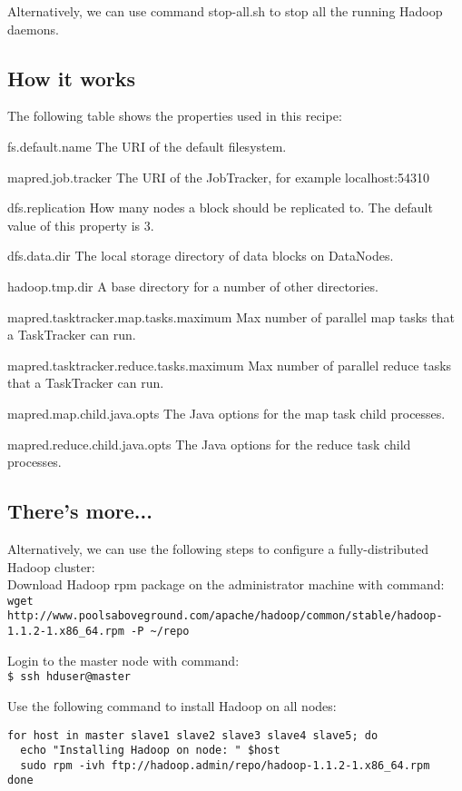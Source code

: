 Alternatively, we can use command stop-all.sh to stop all the running Hadoop daemons.

\subsection*{How it works}
The following table shows the properties used in this recipe:

\begin{description}
    \item{fs.default.name} The URI of the default filesystem.
    \item{mapred.job.tracker} The URI of the JobTracker, for example localhost:54310
    \item{dfs.replication} How many nodes a block should be replicated to. The default value of this property is 3.
    \item{dfs.data.dir} The local storage directory of data blocks on DataNodes.
    \item{hadoop.tmp.dir} A base directory for a number of other directories.
    \item{mapred.tasktracker.map.tasks.maximum} Max number of parallel map tasks that a TaskTracker can run.
    \item{mapred.tasktracker.reduce.tasks.maximum} Max number of parallel reduce tasks that a TaskTracker can run.
    \item{mapred.map.child.java.opts} The Java options for the map task child processes.
    \item{mapred.reduce.child.java.opts} The Java options for the reduce task child processes.
\end{description}

\subsection*{There's more...}
Alternatively, we can use the following steps to configure a fully-distributed Hadoop cluster: \\
Download Hadoop rpm package on the administrator machine with command: \\
\verb|wget http://www.poolsaboveground.com/apache/hadoop/common/stable/hadoop-1.1.2-1.x86_64.rpm -P ~/repo|

Login to the master node with command: \\
\verb|$ ssh hduser@master|

Use the following command to install Hadoop on all nodes:
\begin{verbatim}
for host in master slave1 slave2 slave3 slave4 slave5; do
  echo "Installing Hadoop on node: " $host
  sudo rpm -ivh ftp://hadoop.admin/repo/hadoop-1.1.2-1.x86_64.rpm
done
\end{verbatim}


